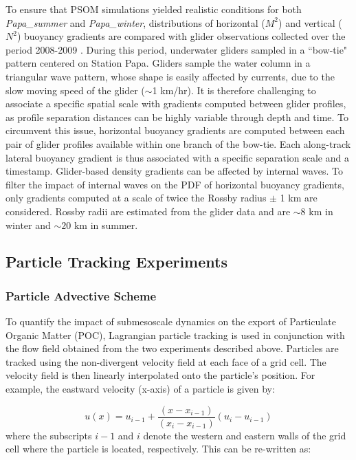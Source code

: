 \documentclass[draft,linenumbers]{agujournal2018}
\begin{document}
To ensure that PSOM simulations yielded realistic conditions for both \textit{Papa\_summer} and \textit{Papa\_winter}, distributions of horizontal ($M^2$) and vertical ($N^2$) buoyancy gradients are compared with glider observations collected over the period 2008-2009 \citep{Pelland_2016}.
During this period, underwater gliders sampled in a ``bow-tie" pattern centered on Station Papa. Gliders sample the water column in a triangular wave pattern, whose shape is easily affected by currents, due to the slow moving speed of the glider ($\sim$1 km/hr). It is therefore challenging to associate a specific spatial scale with gradients computed between glider profiles, as profile separation distances can be highly variable through depth and time. To circumvent this issue, horizontal buoyancy gradients are computed between each pair of glider profiles available within one branch of the bow-tie. Each along-track lateral buoyancy gradient is thus associated with a specific separation scale and a timestamp. Glider-based density gradients can be affected by internal waves. To filter the impact of internal waves on the PDF of horizontal buoyancy gradients, only gradients computed at a scale of twice the Rossby radius $\pm$ 1 km are considered. Rossby radii are estimated from the glider data and are $\sim8$ km in winter and $\sim20$ km in summer.
 
\subsection{Particle Tracking Experiments}

\subsubsection{Particle Advective Scheme}
To quantify the impact of submesoscale dynamics on the export of Particulate Organic Matter (POC), Lagrangian particle tracking is used in conjunction with the flow field obtained from the two experiments described above. Particles are tracked using the non-divergent velocity field at each face of a grid cell. The velocity field is then linearly interpolated onto the particle's position. For example, the eastward velocity (x-axis) of a particle is given by:

\begin{equation}
u(x) = u_{i-1} + \frac{(x - x_{i-1})}{(x_i - x_{i-1})}(u_{i}-u_{i-1})
\end{equation}
where the subscripts $i-1$ and $i$ denote the western and eastern walls of the grid cell where the particle is located, respectively. This can be re-written as:
\end{document}
